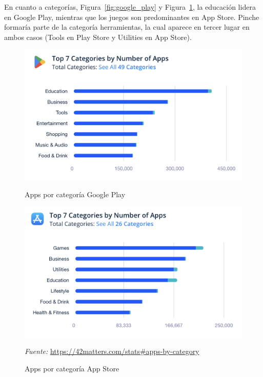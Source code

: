 En cuanto a categorías, Figura~\ref{fig:google_play} y Figura~\ref{fig:app_store}, la educación lidera en Google Play, mientras que los juegos son predominantes en App Store. Pinche formaría parte de la categoría herramientas, la cual aparece en tercer lugar en ambos casos (Tools en Play Store y Utilities en App Store).

\begin{figure}[H]
\centering
\begin{minipage}[t]{0.48\textwidth}
\centering
\includegraphics[width=\linewidth]{img/intro/google_play_categories.png}
\caption{Apps por categoría Google Play}
\label{fig:google_play}
\end{minipage}
\hfill
\begin{minipage}[t]{0.48\textwidth}
\centering
\includegraphics[width=\linewidth]{img/intro/app_store_categories.png}
\caption{Apps por categoría App Store}
\label{fig:app_store}
\end{minipage}
\vspace{0.5em}
\vspace{0.5em}
{\footnotesize \centering \textit{Fuente:} \url{https://42matters.com/stats#apps-by-category} \par}
\end{figure}

